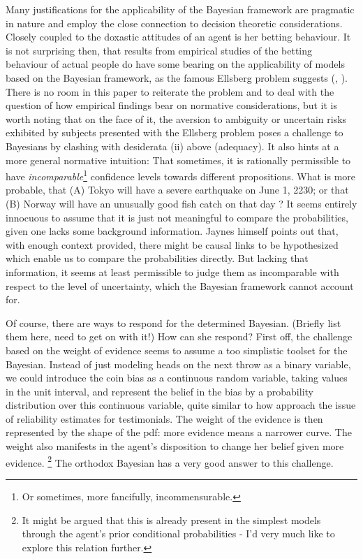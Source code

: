 \documentclass[11pt, a4paper]{scrartcl}
\begin{document}
Many justifications for the applicability of the Bayesian framework are pragmatic in nature and employ the close connection to decision theoretic considerations. Closely coupled to the doxastic attitudes of an agent is her betting behaviour. It is not surprising then, that results from empirical studies of the betting behaviour of actual people do have some bearing on the applicability of models based on the Bayesian framework, as the famous Ellsberg problem suggests (\citet{Ellsberg}, \citet{Camerer1992}). There is no room in this paper to reiterate the problem and to deal with the question of how empirical findings bear on normative considerations, but it is worth noting that on the face of it, the aversion to ambiguity or uncertain risks exhibited by subjects presented with the Ellsberg problem poses a challenge to Bayesians by clashing with desiderata (ii) above (adequacy). It also hints at a more general normative intuition: That sometimes, it is rationally permissible to have \emph{incomparable}\footnote{Or sometimes, more fancifully, incommensurable.} confidence levels towards different propositions. What is more probable, that (A) Tokyo will have a severe earthquake on June 1, 2230; or that (B) Norway will have an unusually good fish catch on that day \citep[p.658]{Jaynes2003-JAYPTT}? It seems entirely innocuous to assume that it is just not meaningful to compare the probabilities, given one lacks some background information. Jaynes himself points out that, with enough context provided, there might be causal links to be hypothesized which enable us to compare the probabilities directly. But lacking that information, it seems at least permissible to judge them as incomparable with respect to the level of uncertainty, which the Bayesian framework cannot account for. 

Of course, there are ways to respond for the determined Bayesian. (Briefly list them here, need to get on with it!) How can she respond? First off, the challenge based on the weight of evidence seems to assume a too simplistic toolset for the Bayesian. Instead of just modeling heads on the next throw as a binary variable, we could introduce the coin bias as a continuous random variable, taking values in the unit interval, and represent the belief in the bias by a probability distribution over this continuous variable, quite similar to how \citet{Olsson2013} approach the issue of reliability estimates for testimonials. The weight of the evidence is then represented by the shape of the pdf: more evidence means a narrower curve. The weight also manifests in the agent's disposition to change her belief given more evidence. \footnote{It might be argued that this is already present in the simplest models through the agent's prior conditional probabilities - I'd very much like to explore this relation further.} The orthodox Bayesian has a very good answer to this challenge.  
\end{document}
